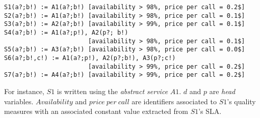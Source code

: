 \begin{small}
\begin{verbatim}
S1(a?;b!) := A1(a?;b!) [availability > 98%, price per call = 0.2$]
S2(a?;b!) := A1(a?;b!) [availability > 98%, price per call = 0.1$]
S3(a?;b!) := A2(a?;b!) [availability > 99%, price per call = 0.1$]
S4(a?;b!) := A1(a?;p!), A2(p?; b!) 
                       [availability > 98%, price per call = 0.1$]
S5(a?;b!) := A3(a?;b!) [availability > 98%, price per call = 0.0$]
S6(a?;b!,c!) := A1(a?;p!), A2(p?;b!), A3(p?;c!) 
                       [availability > 99%, price per call = 0.2$]
S7(a?;b!) := A4(a?;b!) [availability > 99%, price per call = 0.2$]
\end{verbatim}
\end{small}
%
%
%
%
%
%
For instance, $S1$ is written using the \textit{abstract service} $A1$.
$d$ and $p$ are \textit{head} variables. 
$Availability$ and $price \ per \ call$ are identifiers associated to $S1$'s quality measures with an associated constant value extracted from $S1$'s SLA.
%

